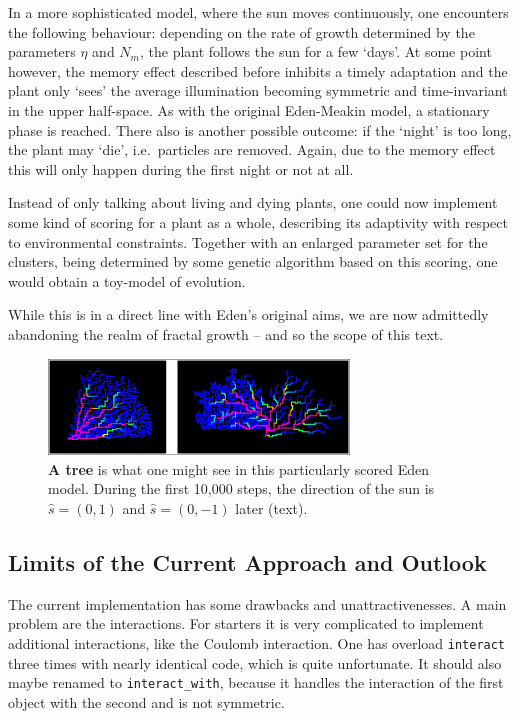 \documentclass[twocolumn, 10pt]{scrartcl}
\begin{document}
                In a more sophisticated model, where the sun moves continuously, one encounters the following
                behaviour: depending on the rate of growth determined by the parameters $\eta$ and $N_m$, the
                plant follows the sun for a few `days'. At some point however, the memory effect described before
                inhibits a timely adaptation and the plant only `sees' the average illumination becoming
                symmetric and time-invariant in the upper half-space. As with the original Eden-Meakin model, a
                stationary phase is reached. There also is another possible outcome: if the `night' is too long,
                the plant may `die', i.e.\ particles are removed. Again, due to the memory effect this will
                only happen during the first night or not at all.

                Instead of only talking about living and dying plants, one could now implement some kind of
                scoring for a plant as a whole, describing its adaptivity with respect to environmental constraints.
                Together with an enlarged parameter set for the clusters, being determined by some genetic
                algorithm based on this scoring, one would obtain a toy-model of evolution.

                While this is in a direct line with Eden's original aims, we are now admittedly abandoning
                the realm of fractal growth -- and so the scope of this text.

        \begin{figure}
            \center
            \includegraphics[width=8cm]{img/edentree.png}
            \caption[A tree]
                {\small\textbf{A tree} is what one might see in this particularly scored Eden model. During
                the first 10,000 steps, the direction of the sun is $\hat s=(0,1)$ and $\hat s=(0,-1)$ later
                (text).}
            \label{fig-edentree}
        \end{figure}

        \subsection{Limits of the Current Approach and Outlook}
            \label{sec-limits}
            The current implementation has some drawbacks and unattractivenesses. A main problem are the
            interactions. For starters it is very complicated to implement additional interactions, like the Coulomb
            interaction. One has overload \lstinline'interact' three times with nearly identical code, which is
            quite unfortunate. It should also maybe renamed to \lstinline'interact_with', because it handles the
            interaction of the first object with the second and is not symmetric.
\end{document}
